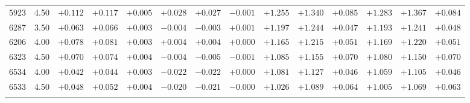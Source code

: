 \documentclass[]{aa}
\begin{document}
\begin{appendix}
\begin{table*}
\begin{center}
\begin{tabular}{llllllllllllll}
5923  &4.50 & $+0.112$ & $+0.117$ & $+0.005$ & $+0.028$ & $+0.027$ & $-0.001$ & $+1.255$ & $+1.340$ & $+0.085$ & $+1.283$ & $+1.367$ & $+0.084$ \\
6287  &3.50 & $+0.063$ & $+0.066$ & $+0.003$ & $-0.004$ & $-0.003$ & $+0.001$ & $+1.197$ & $+1.244$ & $+0.047$ & $+1.193$ & $+1.241$ & $+0.048$ \\
6206  &4.00 & $+0.078$ & $+0.081$ & $+0.003$ & $+0.004$ & $+0.004$ & $+0.000$ & $+1.165$ & $+1.215$ & $+0.051$ & $+1.169$ & $+1.220$ & $+0.051$ \\
6323  &4.50 & $+0.070$ & $+0.074$ & $+0.004$ & $-0.004$ & $-0.005$ & $-0.001$ & $+1.085$ & $+1.155$ & $+0.070$ & $+1.080$ & $+1.150$ & $+0.070$ \\
6534  &4.00 & $+0.042$ & $+0.044$ & $+0.003$ & $-0.022$ & $-0.022$ & $+0.000$ & $+1.081$ & $+1.127$ & $+0.046$ & $+1.059$ & $+1.105$ & $+0.046$ \\
6533  &4.50 & $+0.048$ & $+0.052$ & $+0.004$ & $-0.020$ & $-0.021$ & $-0.000$ & $+1.026$ & $+1.089$ & $+0.064$ & $+1.005$ & $+1.069$ & $+0.063$ \\
\hline\noalign{\smallskip}
\hline\noalign{\smallskip}
\end{tabular}
\end{center}
\end{table*}




\end{appendix}
\end{document}
